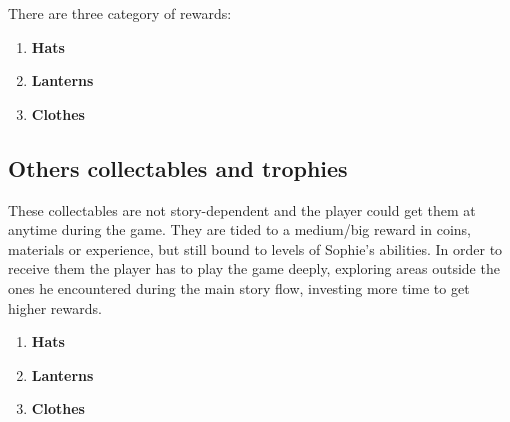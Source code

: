 There are three category of rewards:
\begin{enumerate}
\item \textbf{Hats}\\
  
\item \textbf{Lanterns}\\
  
\item \textbf{Clothes}\\
  
\end{enumerate}


\subsection{Others collectables and trophies}
These collectables are not story-dependent and the player could get them at anytime during the game. They are tided to a medium/big reward in coins, materials or experience, but still bound to levels of Sophie's abilities. In order to receive them the player has to play the game deeply, exploring areas outside the ones he encountered during the main story flow, investing more time to get higher rewards.
\begin{enumerate}
\item \textbf{Hats}\\
  
\item \textbf{Lanterns}\\
  
\item \textbf{Clothes}\\
  
\end{enumerate}


